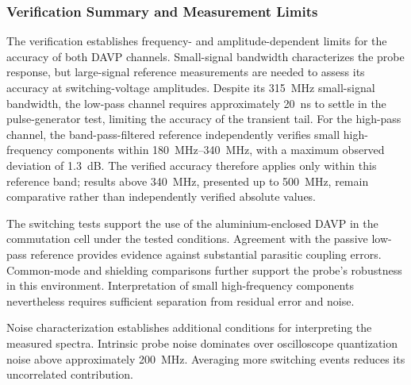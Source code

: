 \subsubsection*{Verification Summary and Measurement Limits}
The verification establishes frequency- and amplitude-dependent limits for the accuracy of both DAVP channels.
Small-signal bandwidth characterizes the probe response, but large-signal reference measurements are needed to assess its accuracy at switching-voltage amplitudes.
Despite its \SI{315}{MHz} small-signal bandwidth, the low-pass channel requires approximately \SI{20}{ns} to settle in the pulse-generator test, limiting the accuracy of the transient tail.
For the high-pass channel, the band-pass-filtered reference independently verifies small high-frequency components within \SIrange{180}{340}{MHz}, with a maximum observed deviation of \SI{1.3}{dB}.
The verified accuracy therefore applies only within this reference band; results above \SI{340}{MHz}, presented up to \SI{500}{MHz}, remain comparative rather than independently verified absolute values.

The switching tests support the use of the aluminium-enclosed DAVP in the commutation cell under the tested conditions.
Agreement with the passive low-pass reference provides evidence against substantial parasitic coupling errors.
Common-mode and shielding comparisons further support the probe's robustness in this environment.
Interpretation of small high-frequency components nevertheless requires sufficient separation from residual error and noise.

Noise characterization establishes additional conditions for interpreting the measured spectra.
Intrinsic probe noise dominates over oscilloscope quantization noise above approximately \SI{200}{MHz}.
Averaging more switching events reduces its uncorrelated contribution.
